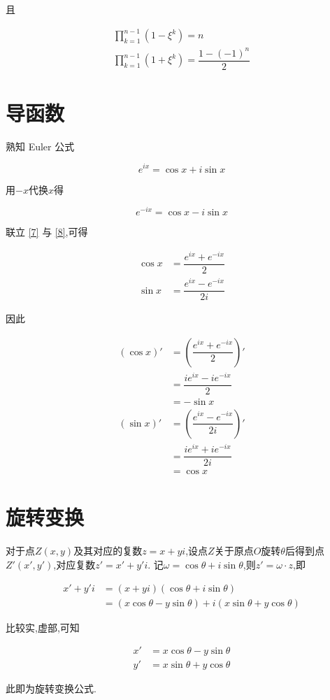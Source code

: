 \documentclass{article}
\begin{document}
且 \par

\begin{align*}
    \prod\limits_{k = 1}^{n - 1} \left( 1 - \xi^k \right) = n \\
    \prod\limits_{k = 1}^{n - 1} \left( 1 + \xi^k \right) = \dfrac{1 - (-1)^n}{2}
\end{align*}

\section{导函数}

熟知 Euler 公式

\begin{equation}
    e^{ix} = \cos x + i \sin x \label{7}
\end{equation}

用$-x$代换$x$得

\begin{equation}
    e^{-ix} = \cos x - i \sin x \label{8}
\end{equation}

联立 \eqref{7} 与 \eqref{8},可得

\begin{align*}
    \cos x & = \dfrac{e^{ix} + e^{-ix}}{2} \\
    \sin x & = \dfrac{e^{ix} - e^{-ix}}{2i}
\end{align*}

因此

\begin{align*}
    (\cos x)' & = \left( \dfrac{e^{ix} + e^{-ix}}{2} \right)' \\
    & = \dfrac{ie^{ix} - ie^{-ix}}{2} \\
    & = -\sin x \\
    (\sin x)' & = \left( \dfrac{e^{ix} - e^{-ix}}{2i} \right)' \\
    & = \dfrac{ie^{ix} + ie^{-ix}}{2i} \\
    & = \cos x
\end{align*}

\section{旋转变换}

对于点$Z(x, y)$及其对应的复数$z = x + yi$,设点$Z$关于原点$O$旋转$\theta$后得到点$Z'(x', y')$,对应复数$z' = x' + y'i$.
记$\omega = \cos \theta + i \sin \theta$,则$z' = \omega \cdot z$,即

\begin{align*}
    x' + y'i & = (x + yi)(\cos \theta + i \sin \theta) \\
    & = (x \cos \theta - y \sin \theta) + i(x \sin \theta + y \cos \theta)
\end{align*}

比较实,虚部,可知

\begin{align*}
    x' & = x \cos \theta - y \sin \theta \\
    y' & = x \sin \theta + y \cos \theta
\end{align*}

此即为旋转变换公式.
\end{document}
